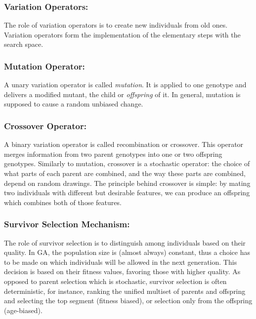 \subsubsection*{Variation Operators:}
The role of variation operators is to create new individuals from old ones. Variation operators form the implementation of the elementary steps with the search space.

\subsubsection*{Mutation Operator:}
A unary variation operator is called \textit{mutation}. It is applied to one genotype and delivers a modified mutant, the child or \textit{offspring} of it.
In general, mutation is supposed to cause a random unbiased change. 

\subsubsection*{Crossover Operator:}
A binary variation operator is called recombination or crossover. This operator merges information from two parent genotypes into one or two offspring genotypes.
Similarly to mutation, crossover is a stochastic operator: the choice of what parts of each parent are combined, and the way these parts are combined, depend on random drawings.
The principle behind crossover is simple: by mating two individuals with different but desirable features, we can produce an offspring which combines both of those features.

\subsubsection*{Survivor Selection Mechanism:}
The role of survivor selection is to distinguish among individuals based on their quality. In GA, the population size is (almost always) constant, thus a choice has to be made on which individuals will be allowed in the next generation. This decision is based on their fitness values, favoring those with higher quality.
As opposed to parent selection which is stochastic, survivor selection is often deterministic, for instance, ranking the unified multiset of parents and offspring and selecting the top segment (fitness biased), or selection only from the offspring (age-biased).



